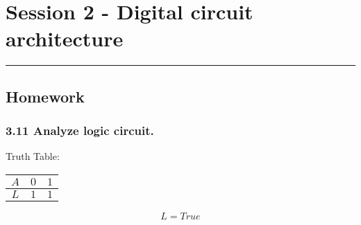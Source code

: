 \section{Session 2 - Digital circuit architecture}
\vspace{-15pt}\noindent\rule{\textwidth}{0.1pt}\vspace{-10pt}
    \subsection{Homework}
    \subsubsection{3.11 \textnormal{Analyze logic circuit}.}
    {\color{hwSolution}
        Truth Table:
        \begin{center}
            \begin{tabular}{c|c c}
                $A$ & $0$ & $1$ \\
                \hline
                $L$ & $1$ & $1$ \\
            \end{tabular}
            \[L = True\]
        \end{center}

}
